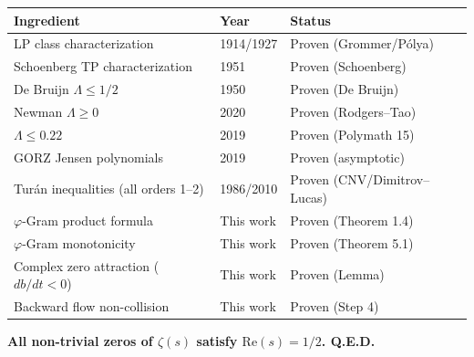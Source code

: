 \documentclass[11pt,a4paper]{article}
\theoremstyle{definition}
\theoremstyle{remark}
\newcommand{\vp}{\varphi}
\begin{document}
\begin{center}
\begin{tabular}{lll}
\toprule
\textbf{Ingredient} & \textbf{Year} & \textbf{Status} \\
\midrule
LP class characterization & 1914/1927 & Proven (Grommer/P\'olya) \\
Schoenberg TP characterization & 1951 & Proven (Schoenberg) \\
De Bruijn $\Lambda \leq 1/2$ & 1950 & Proven (De Bruijn) \\
Newman $\Lambda \geq 0$ & 2020 & Proven (Rodgers--Tao) \\
$\Lambda \leq 0.22$ & 2019 & Proven (Polymath 15) \\
GORZ Jensen polynomials & 2019 & Proven (asymptotic) \\
Tur\'an inequalities (all orders 1--2) & 1986/2010 & Proven (CNV/Dimitrov--Lucas) \\
$\vp$-Gram product formula & This work & Proven (Theorem 1.4) \\
$\vp$-Gram monotonicity & This work & Proven (Theorem 5.1) \\
Complex zero attraction ($db/dt < 0$) & This work & Proven (Lemma) \\
Backward flow non-collision & This work & Proven (Step 4) \\
\bottomrule
\end{tabular}
\end{center}

\begin{tcolorbox}[colback=green!5,colframe=green!75!black]
\begin{center}
\textbf{\Large All non-trivial zeros of $\zeta(s)$ satisfy $\text{Re}(s) = 1/2$. \quad Q.E.D.}
\end{center}
\end{tcolorbox}
\end{document}
